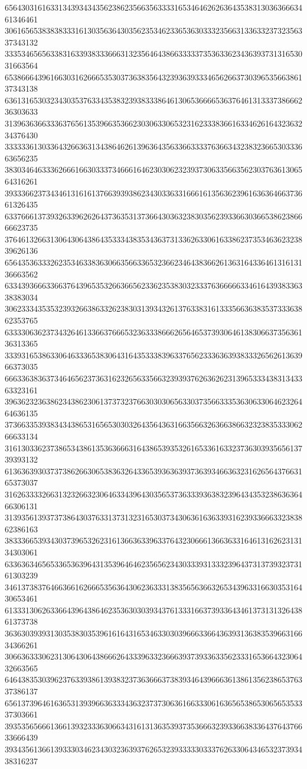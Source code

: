 65643031616331343934343562386235663563333165346462626364353831303636663461346461
30616565383838333161303563643035623534623365363033323566313363323732356337343132
33353465656338316339383336663132356464386633333735363362343639373131653031663564
65386664396166303162666535303736383564323936393334656266373039653566386137343138
63613165303234303537633435383239383338646130653666653637646131333738666236303633
31396363663336376561353966353662303063306532316233383661633462616432363234376430
33333361303364326636313438646261396364356336633337636634323832366530333663656235
38303464633362666166303337346661646230306232393730633566356230376361306564316261
39333662373434613161613766393938623430336331666161356362396163636466373661326435
63376661373932633962626437363531373664303632383035623933663036653862386666623735
37646132663130643064386435333438353436373133626330616338623735346362323839626136
65643536333262353463383630663566336532366234643836626136316433646131613136663562
63343936663366376439653532663665623362353830323337636666633461643938336338383034
30623334353532393266386332623830313934326137633831613335663638353733363862353765
63333063623734326461336637666532363338666265646537393064613830663735636136313365
33393165386330646333653830643164353338396337656233363639383332656261363966373035
66633638363734646562373631623265633566323939376263626231396533343831343363323161
39636232363862343862306137373237663030306563303735663335363063306462326464636135
37366335393834343865316565303032643564363166356632636638663232383533306266633134
31613033623738653438613536366631643865393532616533616332373630393565613739393132
61363639303737386266306538363264336539363639373639346636323162656437663165373037
31626333326631323266323064633439643035653736333936383239643435323863636466306131
31393561393737386430376331373132316530373430636163633931623933666332383862386163
38333665393430373965326231613663633963376432306661366363316461316262313134303061
63363634656533653639643135396464623565623430333931333239643731373932373161303239
34613738376466366162666535636430623633313835656366326534396331663035316430653461
61333130626336643964386462353630303934376133316637393364346137313132643861373738
36363039393130353830353961616431653463303039666336643639313638353966316634366261
30663633306231306430643866626433396332366639373933633562333165366432306432663565
64643835303962376339386139383237363666373839346439666361386135623865376337386137
65613739646163653139396636333436323737306361663330616365653865306565353337303661
39353565666136613932333630663431613136353937353666323933663833643764376633666439
39343561366139333034623430323639376265323933333033376263306434653237393438316237
